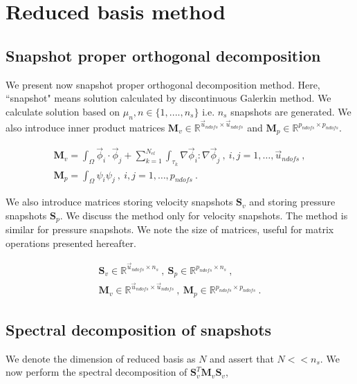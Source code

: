\documentclass[graybox]{svmult}
\begin{document}
\section{Reduced basis method}

\subsection{Snapshot proper orthogonal decomposition}\label{POD_section}

We present now snapshot proper orthogonal decomposition method. Here, ``snapshot" means solution calculated by discontinuous Galerkin method. We calculate solution based on $\mu_n, n \in \lbrace 1,....,n_s \rbrace$ i.e. $n_s$ snapshots are generated. We also introduce inner product matrices $\bm{M}_v \in \mathbb{R}^{\overrightarrow{u}_{ndofs} \times \overrightarrow{u}_{ndofs}}$ and $\bm{M}_p \in \mathbb{R}^{p_{ndofs} \times p_{ndofs}}$.

\begin{gather*}
\bm{M}_v = \int_{\Omega} \overrightarrow{\phi}_i \cdot \overrightarrow{\phi}_j + \sum_{k=1}^{N_{el}} \int_{\tau_k} \nabla \overrightarrow{\phi}_i : \nabla \overrightarrow{\phi}_j \ , \ i,j = 1, \ldots, \overrightarrow{u}_{ndofs} \ , \\
\bm{M}_p = \int_{\Omega} \psi_i \psi_j \ , \ i,j = 1, \ldots, p_{ndofs} \ .
\end{gather*}

We also introduce matrices storing velocity snapshots $\bm{S}_v$ and storing pressure snapshots $\bm{S}_p$. We discuss the method only for velocity snapshots. The method is similar for pressure snapshots. We note the size of matrices, useful for matrix operations presented hereafter.

\begin{gather*}
\bm{S}_v \in \mathbb{R}^{\overrightarrow{u}_{ndofs} \times n_s} \ , \ \bm{S}_p \in \mathbb{R}^{p_{ndofs} \times n_s} \ , \\
\bm{M}_v \in \mathbb{R}^{\overrightarrow{u}_{ndofs} \times \overrightarrow{u}_{ndofs}} \ ,\ \bm{M}_p \in \mathbb{R}^{p_{ndofs} \times p_{ndofs}} \ .
\end{gather*}

\subsection{Spectral decomposition of snapshots}\label{spectral_decomposition_section}

We denote the dimension of reduced basis as $N$ and assert that $N << n_s$. We now perform the spectral decomposition of $\bm{S}_v^T \bm{M}_v \bm{S}_v$,
\end{document}
